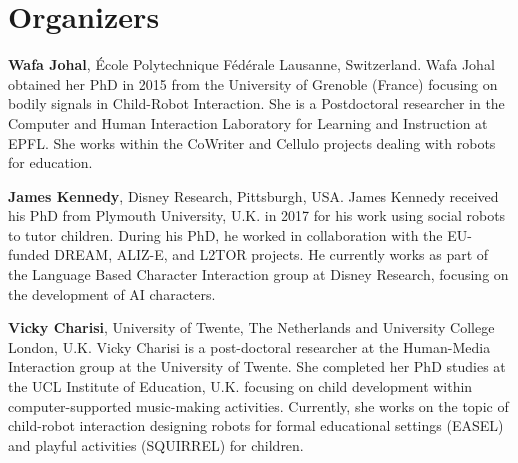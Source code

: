 \documentclass{sig-alternate-05-2015}
\begin{document}
%


\section*{Organizers}
\textbf{Wafa Johal}, École Polytechnique Fédérale Lausanne, Switzerland. Wafa Johal obtained her PhD in 2015 from the University of Grenoble (France) focusing on bodily signals in Child-Robot Interaction. She is a Postdoctoral researcher in the Computer and Human Interaction Laboratory for Learning and Instruction  at EPFL. She works within the CoWriter and Cellulo projects dealing with robots for education. 

\textbf{James Kennedy}, Disney Research, Pittsburgh, USA. James Kennedy received his PhD from Plymouth University, U.K. in 2017 for his work using social robots to tutor children. During his PhD, he worked in collaboration with the EU-funded DREAM, ALIZ-E, and L2TOR projects. He currently works as part of the Language Based Character Interaction group at Disney Research, focusing on the development of AI characters.

\textbf{Vicky Charisi}, University of Twente, The Netherlands and University College London, U.K. Vicky Charisi is a post-doctoral researcher at the Human-Media Interaction group at the University of Twente. She completed her PhD studies at the UCL Institute of Education, U.K. focusing on child development within computer-supported music-making activities. Currently, she works on the topic of child-robot interaction designing robots for formal educational settings (EASEL) and playful activities (SQUIRREL) for children.
\end{document}
